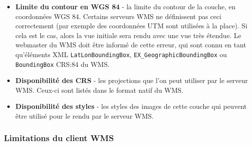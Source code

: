 \begin{itemize}
\begin{itemize}
\item \textbf{Limite du contour en WGS 84} - la limite du contour de la
couche, en coordonn\'ees WGS 84. Certains serveurs WMS ne d\'efinissent pas ceci
correctement (par exemple des coordonn\'ees UTM sont utilis\'ees \`a la place). Si
cela est le cas, alors la vue initiale sera rendu avec une vue tr\`es \'etendue. Le
webmaster du WMS doit \^etre inform\'e de cette erreur, qui sont connu en tant
qu'\'el\'ements XML \texttt{LatLonBoundingBox}, \texttt{EX\_GeographicBoundingBox}
ou \texttt{BoundingBox} CRS:84 du WMS.

\item \textbf{Disponibilit\'e des CRS} - les projections que l'on peut utiliser
par le serveur WMS. Ceux-ci sont list\'es dans le format natif du WMS.

\item \textbf{Disponibilit\'e des styles} - les styles des images de cette couche
qui peuvent \^etre utilis\'e pour le rendu par le serveur WMS.

\end{itemize}

\end{itemize}


\subsubsection{Limitations du client
WMS}\label{sec:ogc-wms-limits}

